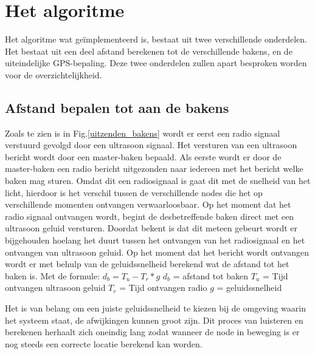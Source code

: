 \documentclass{article}
\begin{document}
\section{Het algoritme}
Het algoritme wat ge\"{i}mplementeerd is, bestaat uit twee verschillende onderdelen. Het bestaat uit een deel afstand berekenen tot de verschillende bakens, en de uiteindelijke GPS-bepaling. 
Deze twee onderdelen zullen apart besproken worden voor de overzichtelijkheid.
	
\subsection{Afstand bepalen tot aan de bakens}
	Zoals te zien is in Fig.\ref{uitzenden_bakens} wordt er eerst een radio signaal verstuurd gevolgd door een ultrasoon signaal. Het versturen van een ultrasoon bericht wordt door een master-baken bepaald. Als eerste wordt er door de master-baken een radio bericht uitgezonden naar iedereen met het bericht welke baken mag sturen. Omdat dit een radiosignaal is gaat dit met de snelheid van het licht, hierdoor is het verschil tussen de verschillende nodes die het op verschillende momenten ontvangen verwaarloosbaar. Op het moment dat het radio signaal ontvangen wordt, begint de desbetreffende baken direct met een ultrasoon geluid versturen. Doordat bekent is dat dit meteen gebeurt wordt er bijgehouden hoelang het duurt tussen het ontvangen van het radiosignaal en het ontvangen van ultrasoon geluid. Op het moment dat het bericht wordt ontvangen wordt er met behulp van de geluidssnelheid berekend wat de afstand tot het baken is. Met de formule:\newline
	$ d_b = T_u- T_r * g $
	\newline\newline
	$ d_b$ = afstand tot baken\newline
	$T_u$ = Tijd ontvangen ultrasoon geluid\newline
	$T_r$ = Tijd ontvangen radio\newline
	$g$ = geluidssnelheid\newline
	
	Het is van belang om een juiste geluidssnelheid te kiezen bij de omgeving waarin het systeem staat, de afwijkingen kunnen groot zijn. Dit proces van luisteren en berekenen herhaalt zich oneindig lang zodat wanneer de node in beweging is er nog steeds een correcte locatie berekend kan worden. 
	
\end{document}
